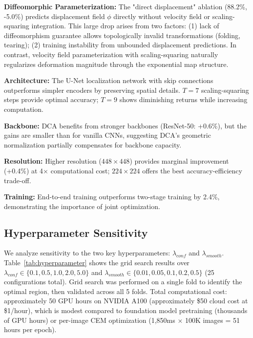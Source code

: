 \documentclass[10pt,journal,compsoc]{IEEEtran}
\begin{document}
\textbf{Diffeomorphic Parameterization:} The "direct displacement" ablation (88.2\%, -5.0\%) predicts displacement field $\phi$ directly without velocity field or scaling-squaring integration. This large drop arises from two factors: (1) lack of diffeomorphism guarantee allows topologically invalid transformations (folding, tearing); (2) training instability from unbounded displacement predictions. In contrast, velocity field parameterization with scaling-squaring naturally regularizes deformation magnitude through the exponential map structure.

\textbf{Architecture:} The U-Net localization network with skip connections outperforms simpler encoders by preserving spatial details. $T=7$ scaling-squaring steps provide optimal accuracy; $T=9$ shows diminishing returns while increasing computation.

\textbf{Backbone:} DCA benefits from stronger backbones (ResNet-50: +0.6\%), but the gains are smaller than for vanilla CNNs, suggesting DCA's geometric normalization partially compensates for backbone capacity.

\textbf{Resolution:} Higher resolution ($448 \times 448$) provides marginal improvement (+0.4\%) at 4$\times$ computational cost; $224 \times 224$ offers the best accuracy-efficiency trade-off.

\textbf{Training:} End-to-end training outperforms two-stage training by 2.4\%, demonstrating the importance of joint optimization.

\subsection{Hyperparameter Sensitivity}
\label{sec:hyperparam}

We analyze sensitivity to the two key hyperparameters: $\lambda_{conf}$ and $\lambda_{smooth}$. Table~\ref{tab:hyperparameter} shows the grid search results over $\lambda_{conf} \in \{0.1, 0.5, 1.0, 2.0, 5.0\}$ and $\lambda_{smooth} \in \{0.01, 0.05, 0.1, 0.2, 0.5\}$ (25 configurations total). Grid search was performed on a single fold to identify the optimal region, then validated across all 5 folds. Total computational cost: approximately 50 GPU hours on NVIDIA A100 (approximately \$50 cloud cost at \$1/hour), which is modest compared to foundation model pretraining (thousands of GPU hours) or per-image CEM optimization (1,850ms × 100K images = 51 hours per epoch).
\end{document}
